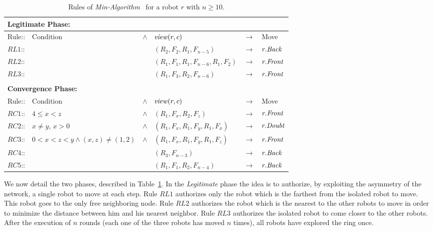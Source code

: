 \begin{table}[tbp]
\small{
\centering
\begin{tabular}{|l l c l c l|}
\hline
\multicolumn{6}{|l|}{ \rule[0.1cm]{0cm}{0.25cm} 
\textbf{Legitimate Phase: }} \\[1pt] \hline
Rule:: & Condition & $\land$ & \multicolumn{1}{l}{$\mathit{view}(r, c)$}&$\rightarrow$&Move\\
\hline
$RL1$:: &&&$(R_2, F_2, R_1, F_{n-5})$& $\rightarrow$&$r.\textit{Back}$\\
$RL2$:: &&&$(R_1, F_1, R_1, F_{n-6}, R_1, F_2)$&$\rightarrow$&$r.\textit{Front}$\\
$RL3$:: &&&$(R_1, F_3, R_2, F_{n-6})$&$\rightarrow$&$r.\textit{Front}$\\
\hline
\multicolumn{5}{l}{ } \\[1pt] \hline
\multicolumn{6}{|l|}{\rule[0.1cm]{0cm}{0.25cm}  
\textbf{Convergence Phase: }}
\\ \hline
Rule:: & Condition & $\land$ & \multicolumn{1}{l}{$\mathit{view}(r, c)$}&$\rightarrow$&Move\\
\hline
$RC1$:: &$4 \leq x < z$&$\wedge $&$(R_1, F_x, R_2, F_z)$&$\rightarrow$&$r.\textit{Front}$\\
$RC2$:: &$x \neq y$, $x > 0$ &$\wedge $&
$(R_1, F_x, R_1, F_y, R_1, F_x)$&$\rightarrow$&$r.\textit{Doubt}$\\
$RC3$:: &$0<x<z<y \wedge (x, z) \neq (1, 2)$&$\wedge $&
$(R_1, F_x, R_1, F_y, R_1, F_z)$&$\rightarrow$&$r.\textit{Front}$\\
$RC4$:: &&&$(R_3, F_{n-3})$&
$\rightarrow$&$r.\textit{Back}$\\
$RC5$:: &&&$(R_1, F_1, R_2, F_{n-4})$&
$\rightarrow$&$r.\textit{Back}$\\
\hline
\end{tabular}}
\caption{Rules of \emph{Min-Algorithm}~\cite{blin_exclusive_2010} 
for a robot $r$ with $n \geq 10$.}
\label{tab: algo-min}
\end{table}

\medskip We now detail the two phases, described in Table~\ref{tab: algo-min}.
In the \emph{Legitimate} phase the idea is to authorize, by exploiting
the asymmetry of the network, a single robot to move at each step.
Rule $RL1$ authorizes only the robot which is the farthest from the
isolated robot to move.  This robot goes to the only free neighboring
node.  Rule $RL2$ authorizes the robot which is the nearest to the
other robots to move in order to minimize the distance between him and
his nearest neighbor.  Rule $RL3$ authorizes the isolated robot to
come closer to the other robots.  After the execution of $n$ rounds
(each one of the three robots has moved $n$ times), all robots have
explored the ring once.
  
